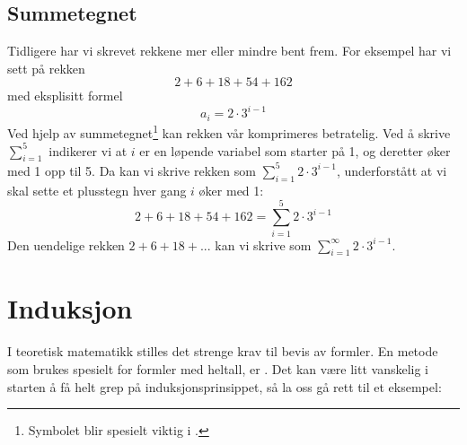 \subsection*{Summetegnet}
Tidligere har vi skrevet rekkene mer eller mindre bent frem. For eksempel har vi sett på rekken
\[ 2+6+18+54+162 \]
med eksplisitt formel
\[ a_i = 2\cdot3^{i-1} \]
Ved hjelp av summetegnet\footnote{Symbolet blir spesielt viktig i .} \sym{$\sum$} kan rekken vår komprimeres betratelig. Ved å skrive $ \sum\limits_{i=1}^5 $ indikerer vi at $ i $ er en løpende variabel som starter på 1, og deretter øker med 1 opp til 5. Da kan vi skrive rekken som $ \sum\limits_{i=1}^5 2\cdot3^{i-1} $, underforstått at vi skal sette et plusstegn hver gang $ i $ øker med 1:
\[ 2+6+18+54+162=\sum\limits_{i=1}^5 2\cdot3^{i-1} \]
Den uendelige rekken 
$ 2+6+18+... $ kan vi skrive som $\sum\limits_{i=1}^\infty 2\cdot3^{i-1}$.

\newpage
{}
\newpage
\section{Induksjon} 
I teoretisk matematikk stilles det strenge krav til bevis av formler. En metode som brukes spesielt for formler med heltall, er . Det kan være litt vanskelig i starten å få helt grep på induksjonsprinsippet, så la oss gå rett til et eksempel:\vsk

